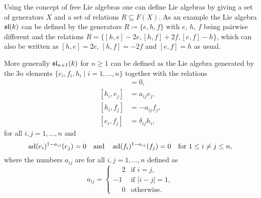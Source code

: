 \begin{rem}
 Using the concept of free Lie algebras one can define Lie algebras by giving a set of generators $X$ and a set of relations $R \subseteq F(X)$. As an example the Lie algebra $\mathfrak{sl}(k)$ can be defined by the generators $R \coloneqq \{e,h,f\}$ with $e$, $h$, $f$ being pairwise different and the relations $R = \{[h,e]-2e, [h,f]+2f, [e,f]-h\}$, which can also be written as $[h,e] = 2e$, $[h,f] = -2f$ and $[e,f] = h$ as usual.
 
 More generally $\mathfrak{sl}_{n+1}(k)$ for $n \geq 1$ can be defined as the Lie algebra generated by the $3n$ elements $\{e_i, f_i, h_i \mid i = 1, \dotsc, n\}$ together with the relations
 \begin{align*}
  [h_i, h_j] &= 0, \\
  [h_i, e_j] &= a_{ij} e_j, \\
  [h_i, f_j] &= -a_{ij} f_j, \\
  [e_i, f_j] &= \delta_{ij} h_i,
 \end{align*}
 for all $i,j = 1, \dotsc, n$ and
 \[
  \operatorname{ad}(e_i)^{1-a_{ij}}(e_j) = 0
  \quad\text{and}\quad
  \operatorname{ad}(f_i)^{1-a_{ij}}(f_j) = 0
  \quad \text{for $1 \leq i \neq j \leq n$},
 \]
 where the numbers $a_{ij}$ are for all $i,j = 1, \dotsc, n$ defined as
 \[
  a_{ij} =
  \begin{cases}
   \phantom{-}2 & \text{if $i = j$}, \\
             -1 & \text{if $|i-j| = 1$}, \\
   \phantom{-}0 & \text{otherwise}.
  \end{cases}
 \]
\end{rem}


